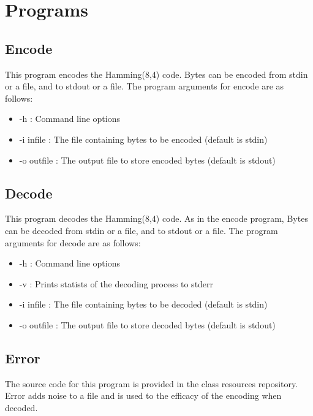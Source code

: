 \documentclass[12pt]{article}
\begin{document}

\section{Programs}

\subsection{Encode}

This program encodes the Hamming(8,4) code. Bytes can be encoded from stdin or
a file, and to stdout or a file. The program arguments for encode are as follows:

\begin{itemize}
    \item{-h : Command line options}
    \item{-i infile : The file containing bytes to be encoded (default is stdin)}
    \item{-o outfile : The output file to store encoded bytes (default is stdout)}
\end{itemize}

\subsection{Decode}

This program decodes the Hamming(8,4) code. As in the encode program, Bytes
can be decoded from stdin or a file, and to stdout or a file. The program 
arguments for decode are as follows:

\begin{itemize}
    \item{-h : Command line options }
    \item{-v : Prints statists of the decoding process to stderr}
    \item{-i infile : The file containing bytes to be decoded (default is stdin)}
    \item{-o outfile : The output file to store decoded bytes (default is stdout)}
\end{itemize}

\subsection{Error}

The source code for this program is provided in the class resources repository.
Error adds noise to a file and is used to the efficacy of the encoding when decoded.
\end{document}
